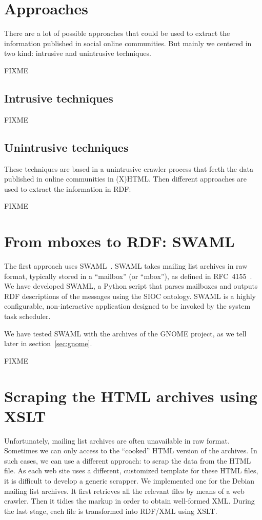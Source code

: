 \documentclass{../templates/www2008-submission}
\begin{document}
\section{Approaches}

There are a lot of possible approaches that could be used to
extract the information published in social online communities.
But mainly we centered in two kind: intrusive
and unintrusive techniques.

FIXME

\subsection{Intrusive techniques}

FIXME

\subsection{Unintrusive techniques}

These techniques are based in a unintrusive crawler process that
fecth the data published in online communities in (X)HTML. Then
different approaches are used to extract the information in RDF:

FIXME

\section{From mboxes to RDF: SWAML}

The first approach uses SWAML~\cite{SWAML2007}. SWAML takes mailing 
list archives in raw format, typically stored in a ``mailbox'' 
(or ``mbox''), as defined in RFC~4155~\cite{RFC4155}. We have 
developed SWAML, a Python script that parses mailboxes and 
outputs RDF descriptions of the messages using the SIOC ontology.
SWAML is a highly configurable, non-interactive application designed 
to be invoked by the system task scheduler.

We have tested SWAML with the archives of the GNOME project,
as we tell later in section~\ref{sec:gnome}.

FIXME

\section{Scraping the HTML archives using XSLT}

Unfortunately, mailing list archives are often unavailable in raw
format. Sometimes we can only access to the ``cooked'' HTML
version of the archives. In such cases, we can use a different
approach: to scrap the data from the HTML file. As each web site
uses a different, customized template for these HTML files, it is
difficult to develop a generic scrapper. We implemented one
for the Debian mailing list archives. It first retrieves all
the relevant files by means of a web crawler. Then it tidies the
markup in order to obtain well-formed XML. During the last stage,
each file is transformed into RDF/XML using XSLT.
\end{document}
